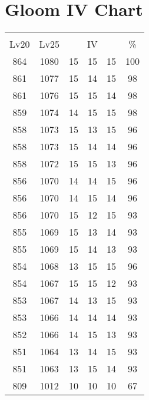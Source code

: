 \documentclass{article}%
\begin{document}
%
\normalsize%
\section{Gloom IV Chart}%
\label{sec:Gloom IV Chart}%
\renewcommand{\arraystretch}{1.5}%
\begin{tabular}{|c|c|c|c|c|c|}%
\hline%
\multicolumn{6}{|c|}{\textcolor{white}{ 
\linebreak{Gloom}
}%
\cellcolor{black}}\\%
\multicolumn{1}{|c}{Lv20}&\multicolumn{1}{c|}{Lv25}&\multicolumn{3}{c|}{IV}&\multicolumn{1}{|c|}{\%}\\%
\hline%
\rowcolor{color100}%
864&1080&15&15&15&100\\%
\hline%
\rowcolor{color98}%
861&1077&15&14&15&98\\%
\hline%
\rowcolor{color98}%
861&1076&15&15&14&98\\%
\hline%
\rowcolor{color98}%
859&1074&14&15&15&98\\%
\hline%
\rowcolor{color96}%
858&1073&15&13&15&96\\%
\hline%
\rowcolor{color96}%
858&1073&15&14&14&96\\%
\hline%
\rowcolor{color96}%
858&1072&15&15&13&96\\%
\hline%
\rowcolor{color96}%
856&1070&14&14&15&96\\%
\hline%
\rowcolor{color96}%
856&1070&14&15&14&96\\%
\hline%
\rowcolor{color93}%
856&1070&15&12&15&93\\%
\hline%
\rowcolor{color93}%
855&1069&15&13&14&93\\%
\hline%
\rowcolor{color93}%
855&1069&15&14&13&93\\%
\hline%
\rowcolor{color96}%
854&1068&13&15&15&96\\%
\hline%
\rowcolor{color93}%
854&1067&15&15&12&93\\%
\hline%
\rowcolor{color93}%
853&1067&14&13&15&93\\%
\hline%
\rowcolor{color93}%
853&1066&14&14&14&93\\%
\hline%
\rowcolor{color93}%
852&1066&14&15&13&93\\%
\hline%
\rowcolor{color93}%
851&1064&13&14&15&93\\%
\hline%
\rowcolor{color93}%
851&1063&13&15&14&93\\%
\hline%
\rowcolor{color91}%
809&1012&10&10&10&67\\%
\end{tabular}

%
\end{document}
